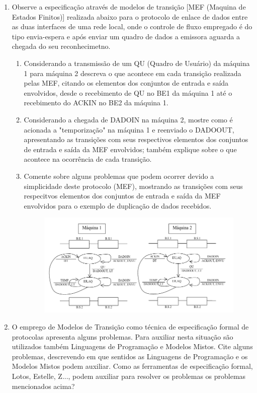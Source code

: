 \documentclass[10pt]{article}
\begin{document}
\begin{enumerate}
    \item Observe a especificação através de modelos de transição [MEF (Maquina 
    de Estados Finitos)] realizada abaixo para o protocolo de enlace de dados entre
    as duas interfaces de uma rede local, onde o controle de fluxo empregado é do tipo
    envia-espera e após enviar um quadro de dados a emissora aguarda a chegada do seu
    reconhecimetno.
    \begin{enumerate}
        \item Considerando a transmissão de um QU (Quadro de Usuário) da máquina 1 
        para máquina 2 descreva o que acontece em cada transição realizada pelas MEF,
        citando os elementos dos conjuntos de entrada e saída envolvidos, desde
        o recebimento de QU no BE1 da máquina 1 até o recebimento do ACKIN no BE2 da
        máquina 1.
        \item Considerando a chegada de DADOIN na máquina 2, mostre como é acionada
        a "temporização" na máquina 1 e reenviado o DADOOUT, apresentando as transições
        com seus respectivos elementos dos conjuntos de entrada e saída da MEF 
        envolvidos; também explique sobre o que acontece na ocorrência de cada 
        transição. 
        \item Comente sobre alguns problemas que podem ocorrer devido a simplicidade 
        deste protocolo (MEF), mostrando as transições com seus respecitvos elementos
        dos conjuntos de entrada e saída da MEF envolvidos para o exemplo de duplicação
        de dados recebidos.
        \begin{figure}[h!]
            \includegraphics[width=\linewidth]{mef.png}
            \label{fig:mef1}
        \end{figure}
    \end{enumerate}
    \item O emprego de Modelos de Transição como técnica de especificação formal de
    protocolas apresenta alguns problemas. Para auxiliar nesta situação são utilizados
    também Linguagens de Programação e Modelos Mistos. Cite alguns problemas, 
    descrevendo em que sentidos as Linguagens de Programação e os Modelos Mistos podem
    auxiliar. Como as ferramentas de especificação formal, Lotos, Estelle, Z..., podem
    auxiliar para resolver os problemas os problemas mencionados acima?


\end{enumerate}
\end{document}
